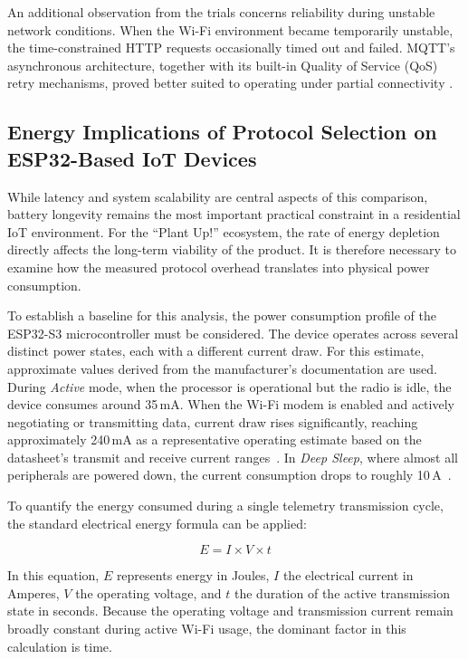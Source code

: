 An additional observation from the trials concerns reliability during unstable network conditions. When the Wi-Fi environment became temporarily unstable, the time-constrained HTTP requests occasionally timed out and failed. MQTT's asynchronous architecture, together with its built-in Quality of Service (QoS) retry mechanisms, proved better suited to operating under partial connectivity \cite{oasisMQTT, thangavel2014mqttCoap, seoane2021CoapMqttSecurity, chenKunz2016IotProtocols}.

\subsection{Energy Implications of Protocol Selection on ESP32-Based IoT Devices}
While latency and system scalability are central aspects of this comparison, battery longevity remains the most important practical constraint in a residential IoT environment. For the ``Plant Up!'' ecosystem, the rate of energy depletion directly affects the long-term viability of the product. It is therefore necessary to examine how the measured protocol overhead translates into physical power consumption.

To establish a baseline for this analysis, the power consumption profile of the ESP32-S3 microcontroller must be considered. The device operates across several distinct power states, each with a different current draw. For this estimate, approximate values derived from the manufacturer's documentation are used. During \textit{Active} mode, when the processor is operational but the radio is idle, the device consumes around 35\,mA. When the Wi-Fi modem is enabled and actively negotiating or transmitting data, current draw rises significantly, reaching approximately 240\,mA as a representative operating estimate based on the datasheet's transmit and receive current ranges~\cite{esp32s3Datasheet2026}. In \textit{Deep Sleep}, where almost all peripherals are powered down, the current consumption drops to roughly 10\,\textmu A~\cite{esp32s3Datasheet2026, espIdfS3SleepModes}.

To quantify the energy consumed during a single telemetry transmission cycle, the standard electrical energy formula can be applied:

\begin{equation}
E = I \times V \times t
\end{equation}

In this equation, $E$ represents energy in Joules, $I$ the electrical current in Amperes, $V$ the operating voltage, and $t$ the duration of the active transmission state in seconds. Because the operating voltage and transmission current remain broadly constant during active Wi-Fi usage, the dominant factor in this calculation is time.

